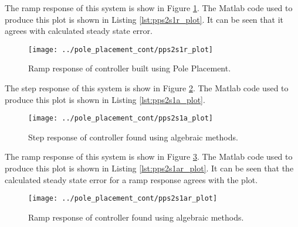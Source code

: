 \documentclass{article}
\newcommand{\sincludepdf}[2][]{
	
}
\begin{document}
\sincludepdf[pages={4}]{scan/11241301.pdf}

The ramp response of this system is show in Figure \ref{fig:pps2s1r_plot}.
The Matlab code used to produce this plot is shown
in Listing \ref{lst:pps2s1r_plot}.
It can be seen that it agrees with calculated steady state error.

\begin{figure}[h!]
\begin{center}
\texttt{[image: ../pole\_placement\_cont/pps2s1r\_plot]}
\end{center}
\caption{Ramp response of controller built using Pole Placement.}
\label{fig:pps2s1r_plot}
\end{figure}



\clearpage
\sincludepdf[pages={4},
			pagecommand=\subsection*{Example 2}
	]{scan/11231301.pdf}

The step response of this system is show in Figure \ref{fig:pps2s1a_plot}.
The Matlab code used to produce this plot is shown
in Listing \ref{lst:pps2s1a_plot}.

\begin{figure}[h!]
\begin{center}
\texttt{[image: ../pole\_placement\_cont/pps2s1a\_plot]}
\end{center}
\caption{Step response of controller found using algebraic methods.}
\label{fig:pps2s1a_plot}
\end{figure}



\sincludepdf[pages={6}]{scan/11241301.pdf}

The ramp response of this system is show in Figure \ref{fig:pps2s1ar_plot}.
The Matlab code used to produce this plot is shown
in Listing \ref{lst:pps2s1ar_plot}.
It can be seen that the calculated steady state error for a ramp
response agrees with the plot.

\begin{figure}[h!]
\begin{center}
\texttt{[image: ../pole\_placement\_cont/pps2s1ar\_plot]}
\end{center}
\caption{Ramp response of controller found using algebraic methods.}
\label{fig:pps2s1ar_plot}
\end{figure}
\end{document}
